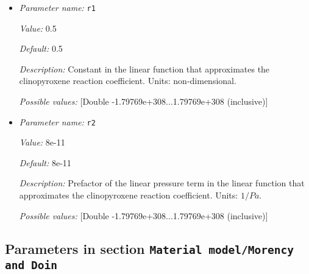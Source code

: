 \begin{itemize}
{\it Description:} Exponent of the melting temperature in the melt fraction calculation. Units: non-dimensional.


{\it Possible values:} [Double -1.79769e+308...1.79769e+308 (inclusive)]
\item {\it Parameter name:} {\tt r1}
\label{parameters:Material model/Latent heat melt/r1}


{\it Value:} 0.5


{\it Default:} 0.5


{\it Description:} Constant in the linear function that approximates the clinopyroxene reaction coefficient. Units: non-dimensional.


{\it Possible values:} [Double -1.79769e+308...1.79769e+308 (inclusive)]
\item {\it Parameter name:} {\tt r2}
\label{parameters:Material model/Latent heat melt/r2}


{\it Value:} 8e-11


{\it Default:} 8e-11


{\it Description:} Prefactor of the linear pressure term in the linear function that approximates the clinopyroxene reaction coefficient. Units: $1/Pa$.


{\it Possible values:} [Double -1.79769e+308...1.79769e+308 (inclusive)]
\end{itemize}

\subsection{Parameters in section \tt Material model/Morency and Doin}
\label{parameters:Material_20model/Morency_20and_20Doin}

